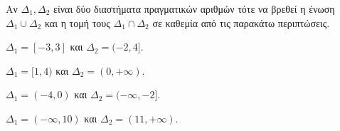 Αν $ \varDelta_1,\varDelta_2 $ είναι δύο διαστήματα πραγματικών αριθμών τότε να βρεθεί η ένωση $ \varDelta_1\cup\varDelta_2 $ και η τομή τους $ \varDelta_1\cap\varDelta_2 $ σε καθεμία από τις παρακάτω περιπτώσεις.
\begin{alist}
\item $ \varDelta_1=[-3,3] $ και $ \varDelta_2=(-2,4] $.
\item $ \varDelta_1=[1,4) $ και $ \varDelta_2=(0,+\infty) $.
\item $ \varDelta_1=(-4,0) $ και $ \varDelta_2=(-\infty,-2] $.
\item $ \varDelta_1=(-\infty,10) $ και $ \varDelta_2=(11,+\infty) $.
\end{alist}
